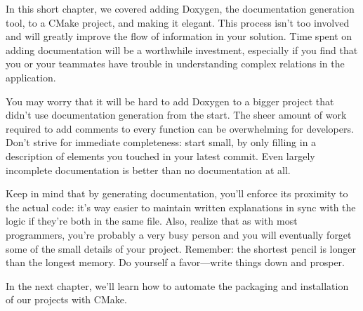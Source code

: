 
In this short chapter, we covered adding Doxygen, the documentation generation tool, to a CMake project, and making it elegant. This process isn't too involved and will greatly improve the flow of information in your solution. Time spent on adding documentation will be a worthwhile investment, especially if you find that you or your teammates have trouble in understanding complex relations in the application.

You may worry that it will be hard to add Doxygen to a bigger project that didn't use documentation generation from the start. The sheer amount of work required to add comments to every function can be overwhelming for developers. Don't strive for immediate completeness: start small, by only filling in a description of elements you touched in your latest commit. Even largely incomplete documentation is better than no documentation at all.

Keep in mind that by generating documentation, you'll enforce its proximity to the actual code: it's way easier to maintain written explanations in sync with the logic if they're both in the same file. Also, realize that as with most programmers, you're probably a very busy person and you will eventually forget some of the small details of your project. Remember: the shortest pencil is longer than the longest memory. Do yourself a favor—write things down and prosper.

In the next chapter, we'll learn how to automate the packaging and installation of our projects with CMake.




